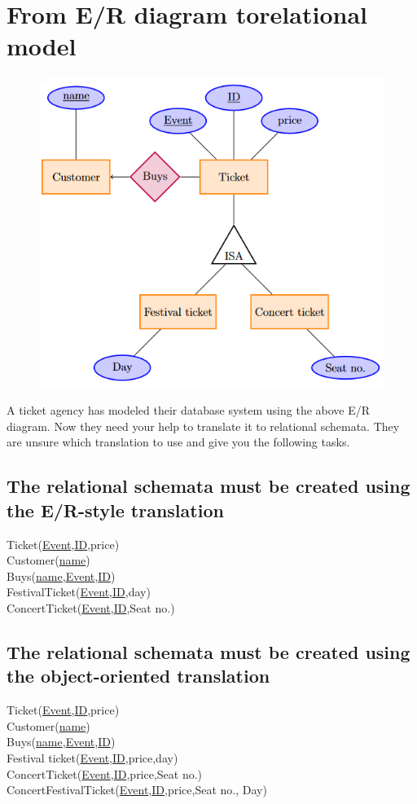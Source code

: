 \documentclass[12pt, a4paper]{article}
\begin{document}
		\section{From E/R diagram torelational model}
			\begin{figure}[h!]
				\includegraphics[width=\textwidth]{assets/ERT0.png}
				\centering
			\end{figure}
			A ticket agency has modeled their database system using the above E/R diagram. Now they need your help to translate it to relational schemata. They are unsure which translation to use and give you the following tasks.
			\subsection{The relational schemata must be created using the E/R-style translation}
				Ticket(\underline{Event},\underline{ID},price)\\
				Customer(\underline{name})\\
				Buys(\underline{name},\underline{Event},\underline{ID})\\
				FestivalTicket(\underline{Event},\underline{ID},day)\\
				ConcertTicket(\underline{Event},\underline{ID},Seat no.)
			\subsection{The relational schemata must be created using the object-oriented translation}
				Ticket(\underline{Event},\underline{ID},price)\\
				Customer(\underline{name})\\
				Buys(\underline{name},\underline{Event},\underline{ID})\\
				Festival ticket(\underline{Event},\underline{ID},price,day)\\
				ConcertTicket(\underline{Event},\underline{ID},price,Seat no.)\\
				ConcertFestivalTicket(\underline{Event},\underline{ID},price,Seat no., Day)
\end{document}
